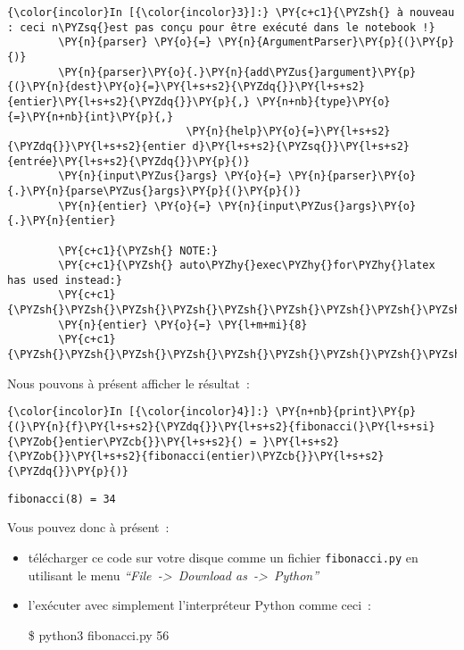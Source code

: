     \begin{Verbatim}[commandchars=\\\{\}]
{\color{incolor}In [{\color{incolor}3}]:} \PY{c+c1}{\PYZsh{} à nouveau : ceci n\PYZsq{}est pas conçu pour être exécuté dans le notebook !}
        \PY{n}{parser} \PY{o}{=} \PY{n}{ArgumentParser}\PY{p}{(}\PY{p}{)}
        \PY{n}{parser}\PY{o}{.}\PY{n}{add\PYZus{}argument}\PY{p}{(}\PY{n}{dest}\PY{o}{=}\PY{l+s+s2}{\PYZdq{}}\PY{l+s+s2}{entier}\PY{l+s+s2}{\PYZdq{}}\PY{p}{,} \PY{n+nb}{type}\PY{o}{=}\PY{n+nb}{int}\PY{p}{,}
                            \PY{n}{help}\PY{o}{=}\PY{l+s+s2}{\PYZdq{}}\PY{l+s+s2}{entier d}\PY{l+s+s2}{\PYZsq{}}\PY{l+s+s2}{entrée}\PY{l+s+s2}{\PYZdq{}}\PY{p}{)}
        \PY{n}{input\PYZus{}args} \PY{o}{=} \PY{n}{parser}\PY{o}{.}\PY{n}{parse\PYZus{}args}\PY{p}{(}\PY{p}{)}
        \PY{n}{entier} \PY{o}{=} \PY{n}{input\PYZus{}args}\PY{o}{.}\PY{n}{entier}
        
        \PY{c+c1}{\PYZsh{} NOTE:}
        \PY{c+c1}{\PYZsh{} auto\PYZhy{}exec\PYZhy{}for\PYZhy{}latex has used instead:}
        \PY{c+c1}{\PYZsh{}\PYZsh{}\PYZsh{}\PYZsh{}\PYZsh{}\PYZsh{}\PYZsh{}\PYZsh{}\PYZsh{}\PYZsh{}}
        \PY{n}{entier} \PY{o}{=} \PY{l+m+mi}{8}
        \PY{c+c1}{\PYZsh{}\PYZsh{}\PYZsh{}\PYZsh{}\PYZsh{}\PYZsh{}\PYZsh{}\PYZsh{}\PYZsh{}\PYZsh{}}
\end{Verbatim}


    Nous pouvons à présent afficher le résultat~:

    \begin{Verbatim}[commandchars=\\\{\}]
{\color{incolor}In [{\color{incolor}4}]:} \PY{n+nb}{print}\PY{p}{(}\PY{n}{f}\PY{l+s+s2}{\PYZdq{}}\PY{l+s+s2}{fibonacci(}\PY{l+s+si}{\PYZob{}entier\PYZcb{}}\PY{l+s+s2}{) = }\PY{l+s+s2}{\PYZob{}}\PY{l+s+s2}{fibonacci(entier)\PYZcb{}}\PY{l+s+s2}{\PYZdq{}}\PY{p}{)}
\end{Verbatim}


    \begin{Verbatim}[commandchars=\\\{\}]
fibonacci(8) = 34

    \end{Verbatim}

    Vous pouvez donc à présent~:

\begin{itemize}
\item
  télécharger ce code sur votre disque comme un fichier
  \texttt{fibonacci.py} en utilisant le menu
  \emph{``File~-\textgreater{}~Download as~-\textgreater{}~Python''}
\item
  l'exécuter avec simplement l'interpréteur Python comme ceci~:

  \$ python3 fibonacci.py 56
\end{itemize}


    
    
    
